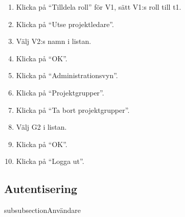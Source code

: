 \documentclass[a4paper]{article}
\begin{document}
\begin{ST}
\begin{enumerate}
\item Klicka på ``Tilldela roll'' för V1, sätt V1:s roll till t1.
\item Klicka på ``Utse projektledare''.
\item Välj V2:s namn i listan.
\item Klicka på ``OK''.
\item Klicka på ``Administrationsvyn''.
\item Klicka på ``Projektgrupper''.
\item Klicka på ``Ta bort projektgrupper''.
\item Välj G2 i listan.
\item Klicka på ``OK''.
\item Klicka på ``Logga ut''. 
\end{enumerate}
\end{ST}




\subsection{Autentisering}

subsubsection{Användare}
\end{document}
